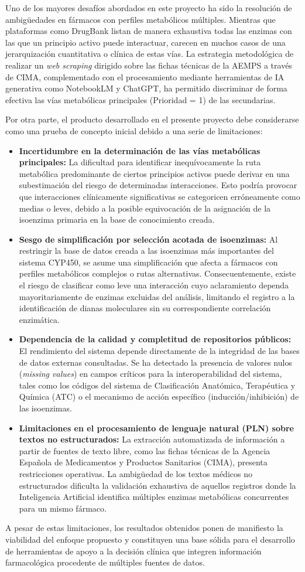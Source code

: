 Uno de los mayores desafíos abordados en este proyecto ha sido la resolución de ambigüedades en fármacos con perfiles metabólicos múltiples. Mientras que plataformas como DrugBank listan de manera exhaustiva todas las enzimas con las que un principio activo puede interactuar, carecen en muchos casos de una jerarquización cuantitativa o clínica de estas vías. La estrategia metodológica de realizar un \textit{web scraping} dirigido sobre las fichas técnicas de la AEMPS a través de CIMA, complementado con el procesamiento mediante herramientas de IA generativa como NotebookLM y ChatGPT, ha permitido discriminar de forma efectiva las vías metabólicas principales (Prioridad = 1) de las secundarias. 

Por otra parte, el producto desarrollado en el presente proyecto debe considerarse como una prueba de concepto inicial debido a una serie de limitaciones:
\begin{itemize}
    \item \textbf{Incertidumbre en la determinación de las vías metabólicas principales:} La dificultad para identificar inequívocamente la ruta metabólica predominante de ciertos principios activos puede derivar en una subestimación del riesgo de determinadas interacciones. Esto podría provocar que interacciones clínicamente significativas se categoricen erróneamente como medias o leves, debido a la posible equivocación de la asignación de la isoenzima primaria en la base de conocimiento creada.
    \item \textbf{Sesgo de simplificación por selección acotada de isoenzimas:} Al restringir la base de datos creada a las isoenzimas más importantes del sistema CYP450, se asume una simplificación que afecta a fármacos con perfiles metabólicos complejos o rutas alternativas. Consecuentemente, existe el riesgo de clasificar como leve una interacción cuyo aclaramiento dependa mayoritariamente de enzimas excluidas del análisis, limitando el registro a la identificación de dianas moleculares sin su correspondiente correlación enzimática.
    \item \textbf{Dependencia de la calidad y completitud de repositorios públicos:} El rendimiento del sistema depende directamente de la integridad de las bases de datos externas consultadas. Se ha detectado la presencia de valores nulos (\textit{missing values}) en campos críticos para la interoperabilidad del sistema, tales como los códigos del sistema de Clasificación Anatómica, Terapéutica y Química (ATC) o el mecanismo de acción específico (inducción/inhibición) de las isoenzimas.
    \item \textbf{Limitaciones en el procesamiento de lenguaje natural (PLN) sobre textos no estructurados:} La extracción automatizada de información a partir de fuentes de texto libre, como las fichas técnicas de la Agencia Española de Medicamentos y Productos Sanitarios (CIMA), presenta restricciones operativas. La ambigüedad de los textos médicos no estructurados dificulta la validación exhaustiva de aquellos registros donde la Inteligencia Artificial identifica múltiples enzimas metabólicas concurrentes para un mismo fármaco.
\end{itemize}
A pesar de estas limitaciones, los resultados obtenidos ponen de manifiesto la viabilidad del enfoque propuesto y constituyen una base sólida para el desarrollo de herramientas de apoyo a la decisión clínica que integren información farmacológica procedente de múltiples fuentes de datos.



